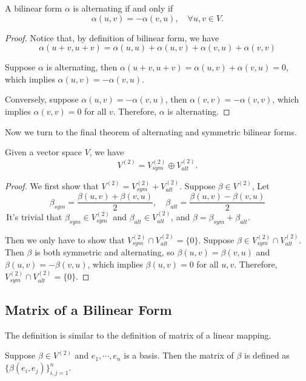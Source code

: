 \begin{proposition}
    A bilinear form $\alpha$ is alternating if and only if 
    $$\alpha(u,v) = -\alpha(v,u), \quad \forall u,v \in V.$$
\end{proposition}
\begin{proof}
Notice that, by definition of bilinear form, we have
$$\alpha(u+v, u+v) = \alpha(u,u) + \alpha(u,v) + \alpha(v,u) + \alpha(v,v)$$

Suppose $\alpha$ is alternating, then $\alpha(u+v, u+v) = \alpha(u,v) + \alpha(v,u) = 0$, which implies $\alpha(u,v) = -\alpha(v,u)$.

Conversely, suppose $\alpha(u,v) = -\alpha(v,u)$, then $\alpha(v,v) = -\alpha(v,v)$, which implies $\alpha(v,v) = 0$ for all $v$. Therefore, $\alpha$ is alternating.
\end{proof}

Now we turn to the final theorem of alternating and symmetric bilinear forms.
\begin{theorem}
Given a vector space $V$, we have $$V^{(2)}= V_{sym}^{(2)} \oplus V_{alt}^{(2)}.$$
\end{theorem}
\begin{proof}
    We first show that $V^{(2)}= V_{sym}^{(2)} + V_{alt}^{(2)}$. Suppose $\beta \in V^{(2)}$, Let
    $$\beta_{sym} = \frac{\beta(u,v) + \beta(v,u)}{2}, \quad \beta_{alt} = \frac{\beta(u,v) - \beta(v,u)}{2}$$
    \,It's trivial that $\beta_{sym} \in V_{sym}^{(2)}$ and $\beta_{alt} \in V_{alt}^{(2)}$, and $\beta = \beta_{sym} + \beta_{alt}$.

    Then we only have to show that $V_{sym}^{(2)} \cap V_{alt}^{(2)} = \{0\}$. 
    Suppose $\beta \in V_{sym}^{(2)} \cap V_{alt}^{(2)}$. Then $\beta$ is both symmetric and alternating, so $\beta(u,v) = \beta(v,u)$ and $\beta(u,v) = -\beta(v,u)$, which implies $\beta(u,v) = 0$ for all $u,v$. Therefore, $V_{sym}^{(2)} \cap V_{alt}^{(2)} = \{0\}$.
\end{proof}


\subsection{Matrix of a Bilinear Form}
The definition is similar to the definition of matrix of a linear mapping.
\begin{definition}
    Suppose $\beta \in V^{(2)}$ and $e_1,\cdots,e_n$ is a basis. Then the matrix of $\beta$ is defined as $\{\beta(e_i,e_j)\}_{i,j = 1}^{n}$. 
\end{definition}


